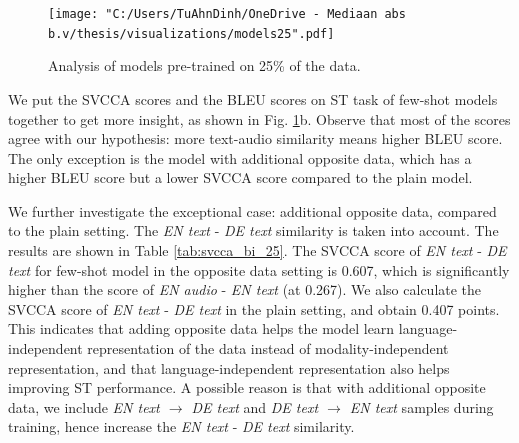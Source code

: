 \documentclass[conference]{IEEEtran}
\begin{document}
	\begin{figure}[htbp]
		\centerline{\texttt{[image: "C:/Users/TuAhnDinh/OneDrive - Mediaan abs b.v/thesis/visualizations/models25".pdf]}}
		\caption{Analysis of models pre-trained on 25\% of the data.}
		\label{fig:models25}
	\end{figure}
	
	
	
	We put the SVCCA scores and the BLEU scores on ST task of few-shot models together to get more insight, as shown in Fig. \ref{fig:models25}b. Observe that most of the scores agree with our hypothesis: more text-audio similarity means higher BLEU score. The only exception is the model with additional opposite data, which has a higher BLEU score but a lower SVCCA score compared to the plain model.
	
	
	We further investigate the exceptional case: additional opposite data, compared to the plain setting. The \textit{EN text} - \textit{DE text} similarity is taken into account. The results are shown in Table \ref{tab:svcca_bi_25}. The SVCCA score of \textit{EN text} - \textit{DE text} for few-shot model in the opposite data setting is 0.607, which is significantly higher than the score of \textit{EN audio} - \textit{EN text} (at 0.267). We also calculate the SVCCA score of \textit{EN text} - \textit{DE text} in the plain setting, and obtain 0.407 points. This indicates that adding opposite data helps the model learn language-independent representation of the data instead of modality-independent representation, and that language-independent representation also helps improving ST performance. A possible reason is that with additional opposite data, we include \textit{EN text $\rightarrow$ DE text} and \textit{DE text $\rightarrow$ EN text} samples during training, hence increase the \textit{EN text} - \textit{DE text} similarity.
	
\end{document}
